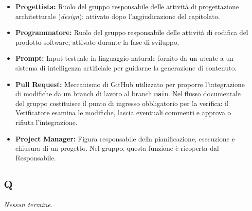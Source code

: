 \begin{itemize}[leftmargin=*]
          per il relativo costo orario ufficiale. Presentato nella Dichiarazione
          degli Impegni; il valore accettato all'aggiudicazione diventa limite
          superiore invalicabile durante lo svolgimento del progetto.
    \item \textbf{Progettista:} Ruolo del gruppo responsabile delle attività di
          progettazione architetturale (\textit{design}); attivato dopo
          l'aggiudicazione del capitolato.
    \item \textbf{Programmatore:} Ruolo del gruppo responsabile delle attività di
          codifica del prodotto software; attivato durante la fase di sviluppo.
    \item \textbf{Prompt:} Input testuale in linguaggio naturale fornito da un
          utente a un sistema di intelligenza artificiale per guidarne la
          generazione di contenuto.
    \item \textbf{Pull Request:} Meccanismo di GitHub utilizzato per proporre
          l'integrazione di modifiche da un branch di lavoro al branch
          \texttt{main}. Nel flusso documentale del gruppo costituisce il punto
          di ingresso obbligatorio per la verifica: il Verificatore esamina le
          modifiche, lascia eventuali commenti e approva o rifiuta l'integrazione.
      \item \textbf{Project Manager:} Figura responsabile della pianificazione, esecuzione e chiusura di un progetto. Nel gruppo, questa funzione è ricoperta dal Responsabile.
\end{itemize}
 
{}
\subsection*{Q}
\textit{Nessun termine.}
 
{}
